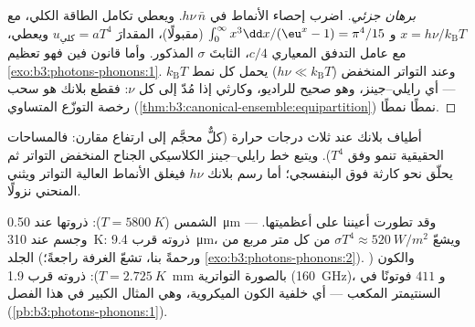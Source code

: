 \begin{proof}[برهان جزئي]
اضرب إحصاء الأنماط في $h\nu\,\bar n$. ويعطي تكامل
الطاقة الكلي، مع $x = h\nu/k_{\text{B}}T$ و $\int_0^\infty
x^3\dd x/(\eu^x - 1) = \pi^4/15$ (مقبولًا)، المقدارَ $u_{\text{كلي}}
= aT^4$ ويعطي، مع عامل التدفق المعياري $c/4$، الثابتَ
$\sigma$ المذكور. وأما قانون فين فهو تعظيم
\cref{exo:b3:photons-phonons:1}. وعند التواتر المنخفض ($h\nu \ll
k_{\text{B}}T$) يحمل كل نمط $k_{\text{B}}T$ ---
أي رايلي--جينز، وهو صحيح للراديو، وكارثي إذا مُدّ إلى كل
$\nu$: فقطع بلانك هو سحب رخصة التوزّع المتساوي
(\cref{thm:b3:canonical-ensemble:equipartition})
نمطًا نمطًا.
\end{proof}

\begin{omfigure}

{\small أطياف بلانك عند ثلاث درجات حرارة (كلٌّ محجَّم إلى
ارتفاع مقارن: فالمساحات الحقيقية تنمو وفق $T^4$). ويتبع خط
رايلي--جينز الكلاسيكي الجناح المنخفض التواتر ثم
يحلّق نحو كارثة فوق البنفسجي؛ أما رسم بلانك $h\nu$ فيغلق
الأنماط العالية التواتر ويثني المنحني نزولًا.}
\end{omfigure}

\begin{example}\label{ex:b3:photons-phonons:thermometers}
الشمس ($T = \qty{5800}{K}$): ذروتها عند \qty{0.50}{\micro m} ---
وقد تطورت أعيننا على أعظميتها. وجسم عند \qty{310}{K}: ذروته
قرب \qty{9.4}{\micro m}، ويشعّ $\sigma T^4 \approx
\qty{520}{W/m^2}$ من كل متر مربع من الجلد (ورحمةً بنا،
تشعّ الغرفة راجعةً؛
\cref{exo:b3:photons-phonons:2}). والكون ($T =
\qty{2.725}{K}$): ذروته قرب \qty{1.9}{mm} بالصورة التواترية
(\qty{160}{GHz})، و $411$ فوتونًا في السنتيمتر المكعب ---
أي خلفية الكون الميكروية، وهي المثال الكبير في هذا الفصل
(\cref{pb:b3:photons-phonons:1}).
\end{example}

